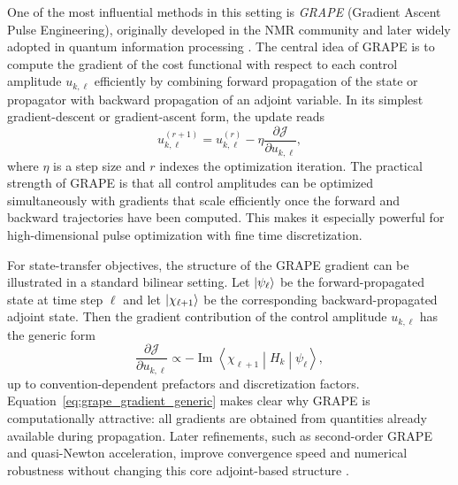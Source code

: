 One of the most influential methods in this setting is \emph{GRAPE} (Gradient Ascent Pulse Engineering), originally developed in the NMR community and later widely adopted in quantum information processing \cite{Khaneja2005,deFouquieres2011}. The central idea of GRAPE is to compute the gradient of the cost functional with respect to each control amplitude $u_{k,\ell}$ efficiently by combining forward propagation of the state or propagator with backward propagation of an adjoint variable. In its simplest gradient-descent or gradient-ascent form, the update reads
\begin{equation}
u_{k,\ell}^{(r+1)}
=
u_{k,\ell}^{(r)}
-
\eta
\frac{\partial \mathcal{J}}{\partial u_{k,\ell}},
\label{eq:grape_update}
\end{equation}
where $\eta$ is a step size and $r$ indexes the optimization iteration. The practical strength of GRAPE is that all control amplitudes can be optimized simultaneously with gradients that scale efficiently once the forward and backward trajectories have been computed. This makes it especially powerful for high-dimensional pulse optimization with fine time discretization.

For state-transfer objectives, the structure of the GRAPE gradient can be illustrated in a standard bilinear setting. Let $\ket{\psi_\ell}$ be the forward-propagated state at time step $\ell$ and let $\ket{\chi_{\ell+1}}$ be the corresponding backward-propagated adjoint state. Then the gradient contribution of the control amplitude $u_{k,\ell}$ has the generic form
\begin{equation}
\frac{\partial \mathcal{J}}{\partial u_{k,\ell}}
\propto
-\operatorname{Im}
\left\langle
\chi_{\ell+1}
\middle|
H_k
\middle|
\psi_\ell
\right\rangle,
\label{eq:grape_gradient_generic}
\end{equation}
up to convention-dependent prefactors and discretization factors. Equation~\eqref{eq:grape_gradient_generic} makes clear why GRAPE is computationally attractive: all gradients are obtained from quantities already available during propagation. Later refinements, such as second-order GRAPE and quasi-Newton acceleration, improve convergence speed and numerical robustness without changing this core adjoint-based structure \cite{deFouquieres2011}.


